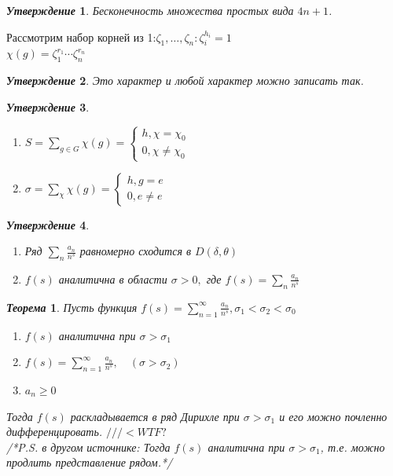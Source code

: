 \documentclass[a4paper,12pt]{article}
\newtheorem{teo2}{\textit{Теорема}}
\newtheorem{utv2}{\textit{Утверждение}}
\newcommand{\TE}{\theta}
\newcommand{\q}{\quad}
\newcommand{\SL}{\sum\limits}
\begin{document}
\begin{formbox}{}
\begin{utv2} Бесконечность множества простых вида $4n+1$.
\end{utv2}
\end{formbox}
\begin{formbox}{}
Рассмотрим набор корней из 1:$\zeta_1,\dots,\zeta_n: \zeta_i^{h_i} = 1$\\
$\chi(g) = \zeta_1^{r_1}\cdots \zeta_n^{r_n}$
\begin{utv2} Это характер и любой характер можно записать так.
\end{utv2}
\end{formbox}
\begin{formbox}{}
\begin{utv2}\q\\
\begin{enumerate}
\item $S = \SL_{g\in G}\chi(g) = \begin{cases}h, \chi = \chi_0\\ 0, \chi \not= \chi_0\end{cases}$
\item $\sigma = \SL_{\chi}\chi(g) = \begin{cases}h, g = e\\ 0, e \not= e\end{cases}$
\end{enumerate}
\end{utv2}
\end{formbox}
\begin{formbox}{}
\begin{utv2}\q\\
\begin{enumerate}
\item Ряд $\SL_n \frac{a_n}{n^s} $ равномерно сходится в $D(\delta, \TE)$
\item $f(s)$ аналитична в области $\sigma > 0,$ где $f(s) = \SL_n\frac{a_n}{n^s}$
\end{enumerate}
\end{utv2}
\end{formbox}
\newpage
\begin{formbox}{}
\begin{teo2} Пусть функция $f(s) = \SL_{n=1}^\infty \frac{a_n}{n^s}, \sigma_1 <\sigma_2 < \sigma_0 $
\begin{enumerate}
\item $f(s)$ аналитична при $\sigma > \sigma_1$
\item $f(s) = \SL_{n=1}^\infty  \frac{a_n}{n^s},\q(\sigma > \sigma_2) $
\item $a_n \ge 0$
\end{enumerate}
Тогда $f(s)$ раскладывается в ряд Дирихле при $\sigma > \sigma_1$ и его можно почленно дифференцировать. $///<WTF?$\\
/*P.S. в другом источнике: Тогда $f(s)$ аналитична при $\sigma > \sigma_1$, т.е. можно продлить представление рядом.*/
\end{teo2}
\end{formbox}
\end{document}
